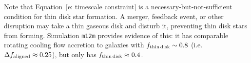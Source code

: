 \documentclass[fleqn,usenatbib]{mnras}
\begin{document}
Note that Equation~\ref{e: timescale constraint} is a necessary-but-not-sufficient condition for thin disk star formation.
A merger, feedback event, or other disruption may take a thin gaseous disk and disturb it, preventing thin disk stars from forming.
Simulation \texttt{m12m} provides evidence of this:
it has comparable rotating cooling flow accretion to galaxies with $f_{\rm thin\,disk}\sim 0.8$ (i.e. $\Delta f_{\rm aligned} \approx 0.25$), but only has $f_{\rm thin\,disk} \approx 0.4$.



\end{document}

